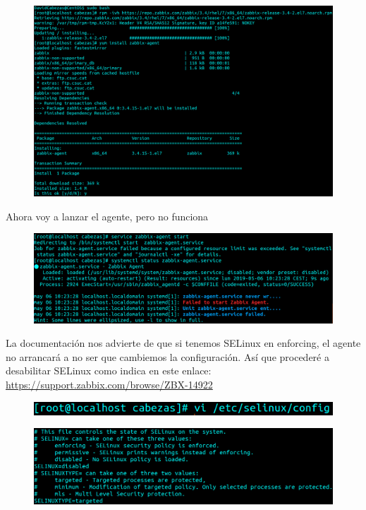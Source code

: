 \documentclass{article}
\begin{document}
\begin{figure}[H]
  \centering
  \includegraphics[width=170mm]{screenshots/centos_installation}
\end{figure}

Ahora voy a lanzar el agente, pero no funciona

\begin{figure}[H]
  \centering
  \includegraphics[width=160mm]{screenshots/centos_error-selinux}
\end{figure}

La documentación nos advierte de que si tenemos SELinux en enforcing,
el agente no arrancará a no ser que cambiemos la configuración. Así
que procederé a desabilitar SELinux como indica en este enlace: \url{https://support.zabbix.com/browse/ZBX-14922}

\begin{figure}[H]
  \centering
  \includegraphics[width=120mm]{screenshots/vi_selinux}
\end{figure}

\begin{figure}[H]
  \centering
  \includegraphics[width=160mm]{screenshots/selinux-config}
\end{figure}
\end{document}
